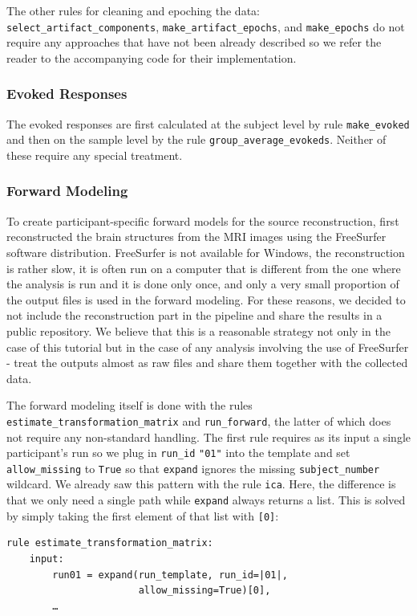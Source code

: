\documentclass[a4paper,man,floatsintext,natbib]{apa6}
\begin{document}
The other rules for cleaning and epoching the data: \verb|select_artifact_components|, \verb|make_artifact_epochs|, and \verb|make_epochs| do not require any approaches that have not been already described so we refer the reader to the accompanying code for their implementation.

\subsubsection{Evoked Responses}
The evoked responses are first calculated at the subject level by rule \verb|make_evoked| and then on the sample level by the rule \verb|group_average_evokeds|. Neither of these require any special treatment.

\subsubsection{Forward Modeling}
To create participant-specific forward models for the source reconstruction, \cite{jasReproducibleMEGEEG2018a} first reconstructed the brain structures from the MRI images using the FreeSurfer software distribution. FreeSurfer is not available for Windows, the reconstruction is rather slow, it is often run on a computer that is different from the one where the analysis is run and it is done only once, and only a very small proportion of the output files is used in the forward modeling. For these reasons, we decided to not include the reconstruction part in the pipeline and share the results in a public repository. We believe that this is a reasonable strategy not only in the case of this tutorial but in the case of any analysis involving the use of FreeSurfer - treat the outputs almost as raw files and share them together with the collected data.

The forward modeling itself is done with the rules \verb|estimate_transformation_matrix| and \verb|run_forward|, the latter of which does not require any non-standard handling. The first rule requires as its input a single participant's run so we plug in \verb|run_id| \verb|"01"| into the template and set \verb|allow_missing| to \verb|True| so that \verb|expand| ignores the missing \verb|subject_number| wildcard. We already saw this pattern with the rule \verb|ica|. Here, the difference is that we only need a single path while \verb|expand| always returns a list. This is solved by simply taking the first element of that list with \verb|[0]|:

\begin{verbatim}
rule estimate_transformation_matrix:
    input:
        run01 = expand(run_template, run_id=|01|,
                       allow_missing=True)[0],
        …
\end{verbatim}
\end{document}

